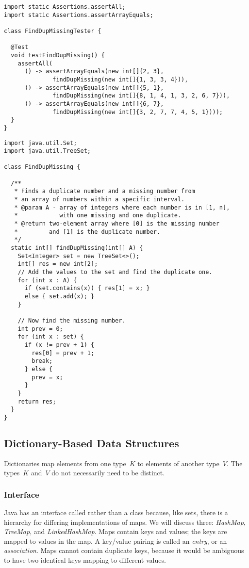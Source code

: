 \begin{lstlisting}[language=MyJava]
import static Assertions.assertAll;
import static Assertions.assertArrayEquals;

class FindDupMissingTester {

  @Test
  void testFindDupMissing() {
    assertAll(
      () -> assertArrayEquals(new int[]{2, 3}, 
              findDupMissing(new int[]{1, 3, 3, 4})),
      () -> assertArrayEquals(new int[]{5, 1}, 
              findDupMissing(new int[]{8, 1, 4, 1, 3, 2, 6, 7})),
      () -> assertArrayEquals(new int[]{6, 7}, 
              findDupMissing(new int[]{3, 2, 7, 7, 4, 5, 1})));
  }
}
\end{lstlisting}

\begin{lstlisting}[language=MyJava]
import java.util.Set;
import java.util.TreeSet;

class FindDupMissing {

  /**
   * Finds a duplicate number and a missing number from 
   * an array of numbers within a specific interval.
   * @param A - array of integers where each number is in [1, n],
   *            with one missing and one duplicate.
   * @return two-element array where [0] is the missing number
   *         and [1] is the duplicate number.
   */
  static int[] findDupMissing(int[] A) {
    Set<Integer> set = new TreeSet<>();
    int[] res = new int[2];
    // Add the values to the set and find the duplicate one.
    for (int x : A) {
      if (set.contains(x)) { res[1] = x; } 
      else { set.add(x); }
    }

    // Now find the missing number.
    int prev = 0;
    for (int x : set) {
      if (x != prev + 1) {
        res[0] = prev + 1;
        break;
      } else {
        prev = x;
      }
    }
    return res;
  }
}
\end{lstlisting}

\subsection{Dictionary-Based Data Structures}
Dictionaries map elements from one type~$K$ to elements of another type~$V$. The types~$K$ and~$V$ do not necessarily need to be distinct. 

\subsubsection*{ Interface}
Java has an interface called  rather than a class because, like sets, there is a hierarchy for differing implementations of maps. 
We will discuss three: \emph{HashMap}, \emph{TreeMap}, and \emph{LinkedHashMap}.
Maps contain keys and values; the keys are mapped to values in the map. 
A key/value pairing is called an \emph{entry}, or an \emph{association}.
Maps cannot contain duplicate keys, because it would be ambiguous to have two identical keys mapping to different values.

